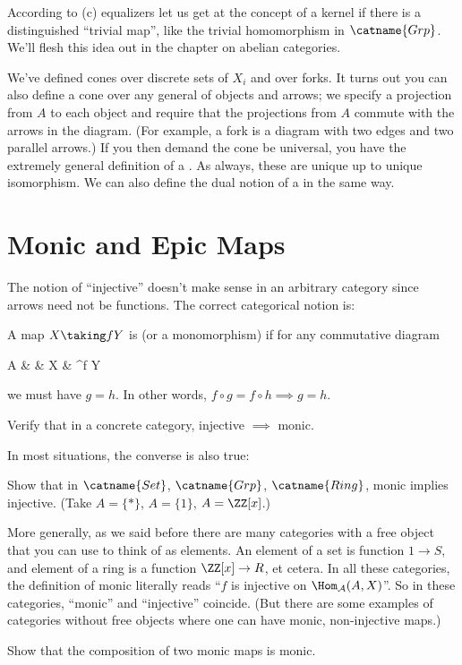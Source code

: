 \documentclass[11pt]{scrreprt}
\begin{document}
According to (c) equalizers let us get at the concept of a kernel if there is a distinguished
``trivial map'', like the trivial homomorphism in $\catname{Grp}$.
We'll flesh this idea out in the chapter on abelian categories.

\begin{remark}
	We've defined cones over discrete sets of $X_i$ and over forks.
	It turns out you can also define a cone over any general  of objects and arrows;
	we specify a projection from $A$ to each object and
	require that the projections from $A$ commute with the arrows in the diagram.
	(For example, a fork is a diagram with two edges and two parallel arrows.)
	If you then demand the cone be universal, you have the extremely general definition of a .
	As always, these are unique up to unique isomorphism.
	We can also define the dual notion of a  in the same way.
\end{remark}

\section{Monic and Epic Maps}
The notion of ``injective'' doesn't make sense in an arbitrary category since arrows need not be functions.
The correct categorical notion is:
\begin{definition}
	A map $X \taking f Y$ is  (or a monomorphism) if for any commutative diagram
	\begin{diagram}
		A &  & X & \rTo^f Y 
	\end{diagram}
	we must have $g = h$.
	In other words, $f \circ g = f \circ h \implies g = h$.
\end{definition}
\begin{ques}
	Verify that in a concrete category,
	injective $\implies$ monic.
\end{ques}
In most situations, the converse is also true:
\begin{exercise}
	Show that in $\catname{Set}$, $\catname{Grp}$, $\catname{Ring}$,
	monic implies injective. (Take $A = \{\ast\}$, $A = \{1\}$, $A = \ZZ[x]$.)
\end{exercise}
More generally, as we said before there are many categories
with a free object that you can use to think of as elements.
An element of a set is function $1 \to S$, and element of a ring is a function $\ZZ[x] \to R$, et cetera.
In all these categories, the definition of monic literally reads ``$f$ is injective on $\Hom_\AA(A, X)$''.
So in these categories, ``monic'' and ``injective'' coincide.
(But there are some examples of categories without free objects where one can have monic,
non-injective maps.)
\begin{ques}
	Show that the composition of two monic maps is monic.
\end{ques}
\end{document}
